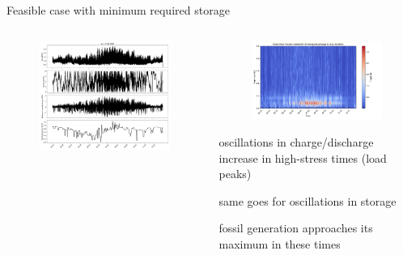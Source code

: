 \documentclass[aspectratio=169,11pt]{beamer}
\begin{document}
\begin{frame}{Feasible case with minimum required storage}
\begin{columns}
    \begin{column}{0.6\textwidth}
        \begin{figure}
            \centering
            \includegraphics[width=\columnwidth]{./figures/hourly_profiles.pdf}
        \end{figure}
    \end{column}
    \begin{column}{0.4\textwidth}
        \begin{figure}
            \centering
            \includegraphics[width=\columnwidth]{./figures/stft_charge_2day_window.pdf}
        \end{figure}
            \BIT
            \item oscillations in charge/discharge increase in high-stress times (load peaks)
            \item same goes for oscillations in storage
            \item fossil generation approaches its maximum in these times
            \EIT
        \end{column}
\end{columns}
\end{frame}
\end{document}
